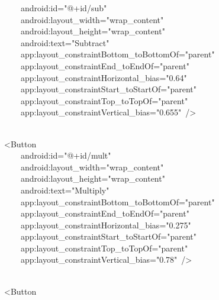 {\ttfamily\small \ \ \ \ \ \ \ \ android:id="@+id/sub"} \\
{\ttfamily\small \ \ \ \ \ \ \ \ android:layout\_width="wrap\_content"} \\
{\ttfamily\small \ \ \ \ \ \ \ \ android:layout\_height="wrap\_content"} \\
{\ttfamily\small \ \ \ \ \ \ \ \ android:text="Subtract"} \\
{\ttfamily\small \ \ \ \ \ \ \ \ app:layout\_constraintBottom\_toBottomOf="parent"} \\
{\ttfamily\small \ \ \ \ \ \ \ \ app:layout\_constraintEnd\_toEndOf="parent"} \\
{\ttfamily\small \ \ \ \ \ \ \ \ app:layout\_constraintHorizontal\_bias="0.64"} \\
{\ttfamily\small \ \ \ \ \ \ \ \ app:layout\_constraintStart\_toStartOf="parent"} \\
{\ttfamily\small \ \ \ \ \ \ \ \ app:layout\_constraintTop\_toTopOf="parent"} \\
{\ttfamily\small \ \ \ \ \ \ \ \ app:layout\_constraintVertical\_bias="0.655"\ /\textgreater{}} \\
\strut \\
{\ttfamily\small \ \ \ \ \textless{}Button} \\
{\ttfamily\small \ \ \ \ \ \ \ \ android:id="@+id/mult"} \\
{\ttfamily\small \ \ \ \ \ \ \ \ android:layout\_width="wrap\_content"} \\
{\ttfamily\small \ \ \ \ \ \ \ \ android:layout\_height="wrap\_content"} \\
{\ttfamily\small \ \ \ \ \ \ \ \ android:text="Multiply"} \\
{\ttfamily\small \ \ \ \ \ \ \ \ app:layout\_constraintBottom\_toBottomOf="parent"} \\
{\ttfamily\small \ \ \ \ \ \ \ \ app:layout\_constraintEnd\_toEndOf="parent"} \\
{\ttfamily\small \ \ \ \ \ \ \ \ app:layout\_constraintHorizontal\_bias="0.275"} \\
{\ttfamily\small \ \ \ \ \ \ \ \ app:layout\_constraintStart\_toStartOf="parent"} \\
{\ttfamily\small \ \ \ \ \ \ \ \ app:layout\_constraintTop\_toTopOf="parent"} \\
{\ttfamily\small \ \ \ \ \ \ \ \ app:layout\_constraintVertical\_bias="0.78"\ /\textgreater{}} \\
\strut \\
{\ttfamily\small \ \ \ \ \textless{}Button} \\

